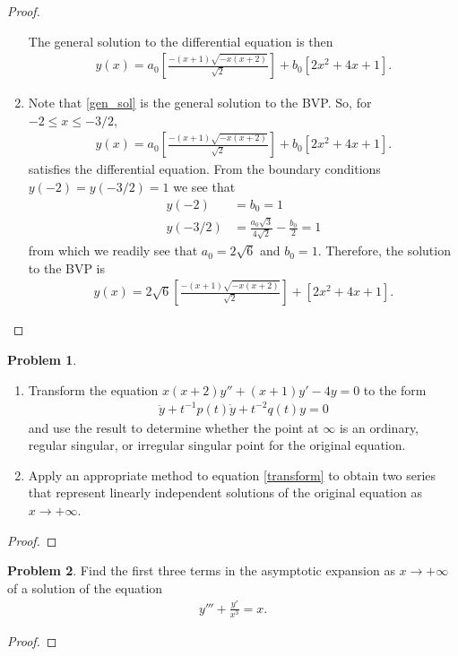 \documentclass[12pt]{article}
\theoremstyle{definition}
\newtheorem{problem}{Problem}
\begin{document}
\begin{proof}
\begin{enumerate}
      The general solution to the differential equation is then
      \begin{align}\label{gen_sol}
        y(x) = a_0\left[\frac{-(x+1)\sqrt{-x(x+2)}}{\sqrt{2}}\right] + b_0\left[2x^2+4x+1\right].
      \end{align}

      \item Note that \eqref{gen_sol} is the general solution to the BVP.
        So, for $-2 \leq x \leq -3/2$,
        \begin{align*}
          y(x) = a_0\left[\frac{-(x+1)\sqrt{-x(x+2)}}{\sqrt{2}}\right] + b_0\left[2x^2+4x+1\right].
        \end{align*}
        satisfies the differential equation. From the boundary conditions $y(-2) = y(-3/2) = 1$
        we see that
        \begin{align*}
          y(-2) &= b_0 = 1 \\
          y(-3/2) &= \frac{a_0\sqrt{3}}{4\sqrt{2}}  - \frac{b_0}{2} = 1
        \end{align*}
        from which we readily see that $a_0 = 2\sqrt{6}$ and $b_0 = 1$. Therefore,
        the solution to the BVP is
        \begin{align*}
          y(x) = 2\sqrt{6}\left[\frac{-(x+1)\sqrt{-x(x+2)}}{\sqrt{2}}\right] + \left[2x^2+4x+1\right].
        \end{align*}
  \end{enumerate}
\end{proof}
\newpage


\begin{problem}
  \begin{enumerate}
    \item Transform the equation $x(x+2)y'' + (x+1)y' - 4y = 0$ to the form
      \begin{align}\label{transform}
        \ddot{y} + t^{-1}p(t)\dot{y} + t^{-2}q(t)y = 0
      \end{align}
      and use the result to determine whether the point at $\infty$ is an ordinary, regular
      singular, or irregular singular point for the original equation.
    \item Apply an appropriate method to equation \eqref{transform}  to obtain
      two series that represent linearly independent solutions of the original
      equation as $x \to +\infty$.
  \end{enumerate}
\end{problem}

\begin{proof}
\end{proof}
\newpage


\begin{problem}
  Find the first three terms in the asymptotic expansion as $x \to +\infty$
  of a solution of the equation
  \begin{align*}
    y''' + \frac{y'}{x^3} = x.
  \end{align*}
\end{problem}

\begin{proof}
\end{proof}
\end{document}
